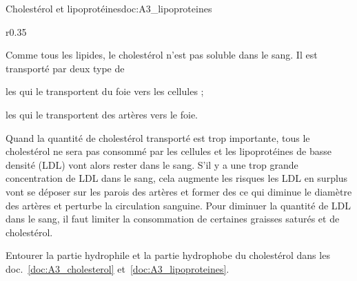 \begin{doc}{Cholestérol et lipoprotéines}{doc:A3_lipoproteines}
  \begin{wrapfigure}[15]{r}{0.35\linewidth}
    \vspace*{-30pt}
    \centering

  \end{wrapfigure}
  
  Comme tous les lipides, le cholestérol n'est pas soluble dans le sang.
  Il est transporté par deux type de 
  \begin{listePoints}
    \item les  qui le transportent du foie vers les cellules ;
    \item les  qui le transportent des artères vers le foie.
  \end{listePoints}

  Quand la quantité de cholestérol transporté est trop importante, tous le cholestérol ne sera pas consommé par les cellules et les lipoprotéines de basse densité (LDL) vont alors rester dans le sang.
  S'il y a une trop grande concentration de LDL dans le sang, cela augmente les risques  les LDL en surplus vont se déposer sur les parois des artères et former des  ce qui diminue le diamètre des artères et perturbe la circulation sanguine.
  Pour diminuer la quantité de LDL dans le sang, il faut limiter la consommation de certaines graisses saturés et de cholestérol.
\end{doc}


\numeroQuestion
  Entourer la partie hydrophile et la partie hydrophobe du cholestérol dans les doc.~\ref{doc:A3_cholesterol} et~\ref{doc:A3_lipoproteines}.
